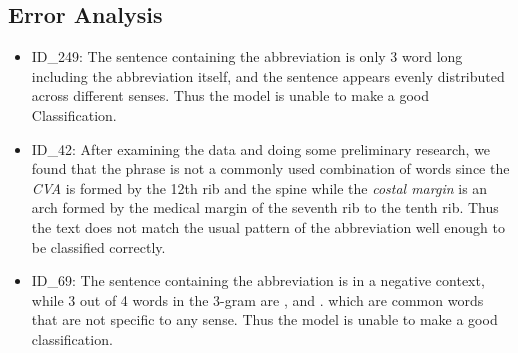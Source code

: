 \documentclass{article}
\begin{document}
    \subsection{Error Analysis}
    \begin{itemize}
        \item ID\_249: The sentence containing the abbreviation is only 3 word long including the abbreviation itself, and the sentence appears evenly distributed across different senses. Thus the model is unable to make a good Classification.
        \item ID\_42: After examining the data and doing some preliminary research, we found that the phrase  is not a commonly used combination of words since the \textit{CVA} is formed by the 12th rib and the spine while the \textit{costal margin} is an arch formed by the medical margin of the seventh rib to the tenth rib. Thus the text does not match the usual pattern of the abbreviation well enough to be classified correctly.
        \item ID\_69: The sentence containing the abbreviation is in a negative context, while 3 out of 4 words in the 3-gram are ,  and . which are common words that are not specific to any sense. Thus the model is unable to make a good classification.
    \end{itemize}
\end{document}
